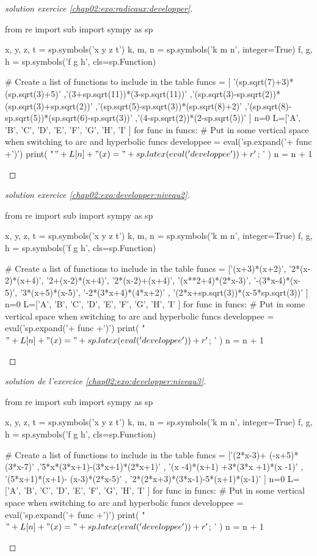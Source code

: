 \begin{proof}[solution exercice \ref{chap02:exo:radicaux:developper}] 
	\begin{pycode}
from re import sub
import sympy as sp

x, y, z, t = sp.symbols('x y z t')
k, m, n = sp.symbols('k m n', integer=True)
f, g, h = sp.symbols('f g h', cls=sp.Function)

# Create a list of functions to include in the table
funcs = [ '(sp.sqrt(7)+3)*(sp.sqrt(3)+5)'
,'(3+sp.sqrt(11))*(3-sp.sqrt(11))'  
,'(sp.sqrt(3)-sp.sqrt(2))*(sp.sqrt(3)+sp.sqrt(2))'
,'(sp.sqrt(5)-sp.sqrt(3))*(sp.sqrt(8)+2)'
,'(sp.sqrt(8)-sp.sqrt(5))*(sp.sqrt(6)-sp.sqrt(3))'
,'(4-sp.sqrt(2))*(2-sp.sqrt(5))'
]
n=0
L=['A', 'B', 'C', 'D', 'E', 'F', 'G', 'H', 'I'  ]
for func in funcs:
	# Put in some vertical space when switching to arc and hyperbolic funcs
	developpee =  eval('sp.expand('+ func +')')
	print( "$"+L[n] + "(x) =" + sp.latex( eval('developpee') )  + r'$; ' )
	n     = n + 1
	\end{pycode}
\end{proof} 

\begin{proof}[solution exercice \ref{chap02:exo:developper:niveau2}]
\begin{pycode}
from re import sub
import sympy as sp

x, y, z, t = sp.symbols('x y z t')
k, m, n = sp.symbols('k m n', integer=True)
f, g, h = sp.symbols('f g h', cls=sp.Function)

# Create a list of functions to include in the table
funcs = ['(x+3)*(x+2)', 
'2*(x-2)*(x+4)',
'2+(x-2)*(x+4)',
'2*(x-2)+(x+4)',
'(x**2+4)*(2*x-3)',
'-(3*x-4)*(x-5)',
'3*(x+5)*(x-5)',
'-2*(3*x+4)*(4*x+2)' ,
'(2*x+sp.sqrt(3))*(x-5*sp.sqrt(3))'
]
n=0
L=['A', 'B', 'C', 'D', 'E', 'F', 'G', 'H', 'I'  ]
for func in funcs:
	# Put in some vertical space when switching to arc and hyperbolic funcs 
	developpee =  eval('sp.expand('+ func +')') 
	print( "$"+L[n] + "(x) =" + sp.latex( eval('developpee') )  + r'$; ' ) 
	n     = n + 1 
\end{pycode}
\end{proof}
 
\begin{proof}[solution de l'exercice \ref{chap02:exo:developper:niveau3}]
\begin{pycode}
from re import sub
import sympy as sp

x, y, z, t = sp.symbols('x y z t')
k, m, n = sp.symbols('k m n', integer=True)
f, g, h = sp.symbols('f g h', cls=sp.Function)

# Create a list of functions to include in the table
funcs = ['(2*x-3)+ (-x+5)*(3*x-7)'  
,'5*x*(3*x+1)-(3*x+1)*(2*x+1)'
, '(x -4)*(x+1) +3*(3*x +1)*(x -1)'
, '(5*x+1)*(x+1)- (x-3)*(2*x-5)'
, '2*(2*x+3)*(3*x-1)-5*(x+1)*(x-1)' 
]
n=0
L=['A', 'B', 'C', 'D', 'E', 'F', 'G', 'H', 'I'  ]
for func in funcs:
	# Put in some vertical space when switching to arc and hyperbolic funcs 
	developpee =  eval('sp.expand('+ func +')') 
	print( "$"+L[n] + "(x) =" + sp.latex( eval('developpee') )  + r'$; ' ) 
	n     = n + 1 
\end{pycode}
\end{proof}
 
